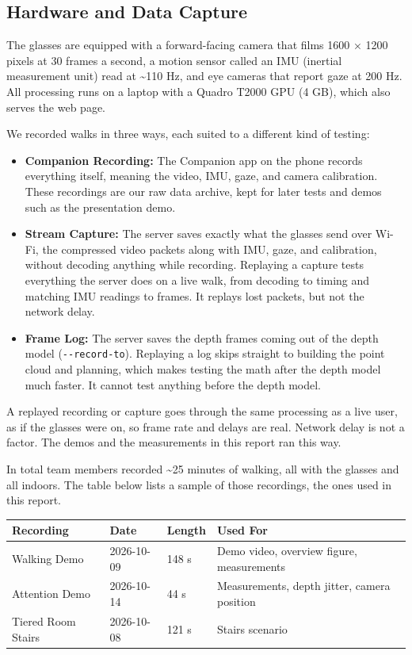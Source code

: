 \documentclass[a4paper]{article}
\begin{document}
\subsection{Hardware and Data Capture} \label{hardware-and-data-capture}
The glasses are equipped with a forward-facing camera that films 1600 × 1200 pixels at 30 frames a second, a motion sensor called an IMU (inertial measurement unit) read at \textasciitilde 110 Hz, and eye cameras that report gaze at 200 Hz. All processing runs on a laptop with a Quadro T2000 GPU (4 GB), which also serves the web page.

We recorded walks in three ways, each suited to a different kind of testing:
\begin{itemize}
	\item \textbf{Companion Recording:} The Companion app on the phone records everything itself, meaning the video, IMU, gaze, and camera calibration. These recordings are our raw data archive, kept for later tests and demos such as the presentation demo.
	\item \textbf{Stream Capture:} The server saves exactly what the glasses send over Wi-Fi, the compressed video packets along with IMU, gaze, and calibration, without decoding anything while recording. Replaying a capture tests everything the server does on a live walk, from decoding to timing and matching IMU readings to frames. It replays lost packets, but not the network delay.
	\item \textbf{Frame Log:} The server saves the depth frames coming out of the depth model (\verb`--record-to`). Replaying a log skips straight to building the point cloud and planning, which makes testing the math after the depth model much faster. It cannot test anything before the depth model.
\end{itemize}

A replayed recording or capture goes through the same processing as a live user, as if the glasses were on, so frame rate and delays are real. Network delay is not a factor. The demos and the measurements in this report ran this way.

In total team members recorded \textasciitilde 25 minutes of walking, all with the glasses and all indoors. The table below lists a sample of those recordings, the ones used in this report.

\begin{table}[H]
\centering
\begin{tabular}{|l|l|l|l|}
	\hline
	\textbf{Recording} & \textbf{Date} & \textbf{Length} & \textbf{Used For} \\
	\hline
	Walking Demo & 2026-10-09 & 148 s & Demo video, overview figure, measurements \\
	Attention Demo & 2026-10-14 & 44 s & Measurements, depth jitter, camera position \\
	Tiered Room Stairs & 2026-10-08 & 121 s & Stairs scenario \\
	\hline
\end{tabular}
\end{table}
\end{document}
